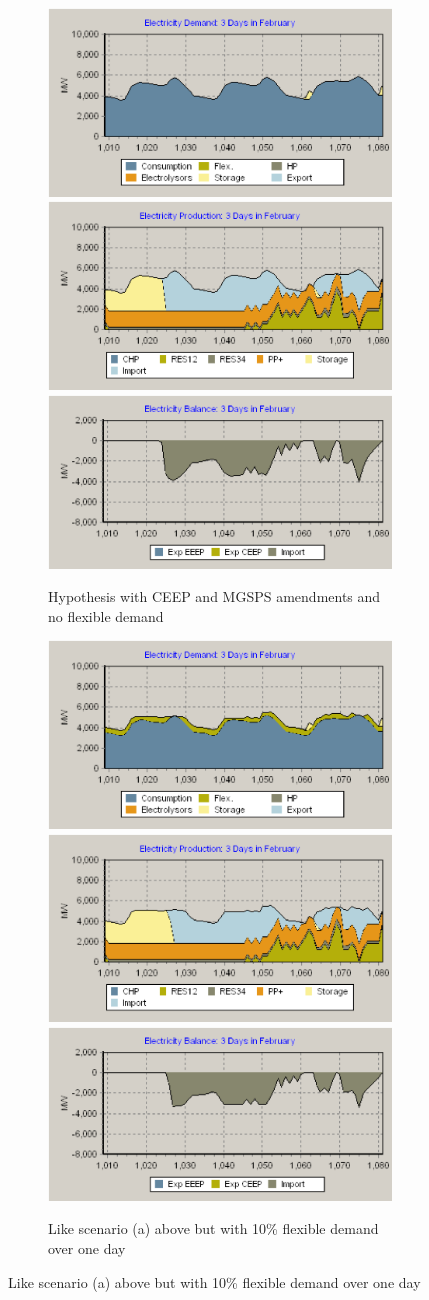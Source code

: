 \begin{figure}[htbp]
	\centering
	
	\begin{subfigure}{\textwidth}
		\centering
		\includegraphics[width=.3\textwidth]{figures/B14-3day-demand.png}\hfill
		\includegraphics[width=.3\textwidth]{figures/B14-3day-production.png}\hfill
		\includegraphics[width=.325\textwidth]{figures/B14-3day-balance.png}
		\caption{Hypothesis with CEEP and MGSPS amendments and no flexible demand}
		\label{fig:B14}
	\end{subfigure}
	
	\vspace{0.25cm}
	
	\begin{subfigure}{\textwidth}
		\centering
		\includegraphics[width=.3\textwidth]{figures/B12-3day-demand.png}\hfill
		\includegraphics[width=.3\textwidth]{figures/B12-3day-production.png}\hfill
		\includegraphics[width=.325\textwidth]{figures/B12-3day-balance.png}
		\caption{Like scenario (a) above but with 10\% flexible demand over one day}
		\label{fig:B12}
	\end{subfigure}
	

\end{figure}
